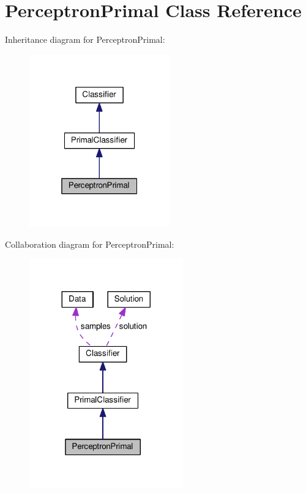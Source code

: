 \hypertarget{class_perceptron_primal}{}\section{Perceptron\+Primal Class Reference}
\label{class_perceptron_primal}


Inheritance diagram for Perceptron\+Primal\+:
\nopagebreak
\begin{figure}[H]
\begin{center}
\leavevmode
\includegraphics[width=172pt]{class_perceptron_primal__inherit__graph}
\end{center}
\end{figure}


Collaboration diagram for Perceptron\+Primal\+:
\nopagebreak
\begin{figure}[H]
\begin{center}
\leavevmode
\includegraphics[width=188pt]{class_perceptron_primal__coll__graph}
\end{center}
\end{figure}
